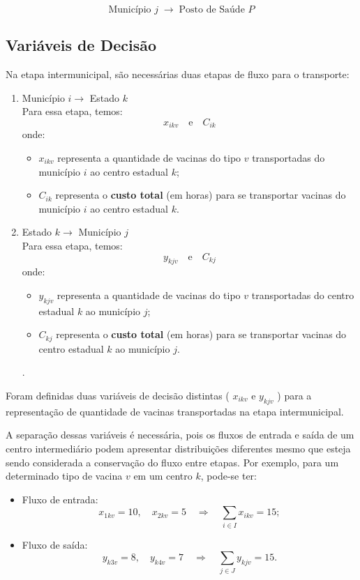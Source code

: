 \[
\text{Município } j \;\longrightarrow\; \text{Posto de Saúde } P
\]

\subsection{Variáveis de Decisão}

Na etapa intermunicipal, são necessárias duas etapas de fluxo para o transporte:

\begin{enumerate}
    \item Município $i \longrightarrow$ Estado $k$ \\
    Para essa etapa, temos:
    \[ x_{ikv} \quad \text{e} \quad C_{ik}\]
    onde:
    \begin{itemize}
    \item $x_{ikv}$ representa a quantidade de vacinas do tipo $v$ transportadas do município $i$ ao centro estadual $k$;
    \item $C_{ik}$ representa o \textbf{custo total} (em horas) para se transportar vacinas do município $i$ ao centro estadual $k$.
    \end{itemize}
    
    \item Estado $k \longrightarrow$ Município $j$ \\
    Para essa etapa, temos:
    \[y_{kjv} \quad \text{e} \quad C_{kj}\]
    onde:
     \begin{itemize}
    \item $y_{kjv}$ representa a quantidade de vacinas do tipo $v$ transportadas do centro estadual $k$ ao município $j$;
    \item $C_{kj}$ representa o \textbf{custo total} (em horas) para se transportar vacinas do centro estadual $k$ ao município $j$.
    \end{itemize}.
\end{enumerate}

Foram definidas duas variáveis de decisão distintas ( $x_{ikv}$ e $y_{kjv}$ ) para a representação de quantidade de vacinas transportadas na etapa intermunicipal.

A separação dessas variáveis é necessária, pois os fluxos de entrada e saída de um centro intermediário podem apresentar distribuições diferentes mesmo que esteja sendo considerada a conservação do fluxo entre etapas. Por exemplo, para um determinado tipo de vacina $v$ em um centro $k$, pode-se ter:

\begin{itemize}
\item Fluxo de entrada:
\[
x_{1kv} = 10, \quad x_{2kv} = 5 \quad \Rightarrow \quad \sum_{i \in I} x_{ikv} = 15;
\]

\item Fluxo de saída:
\[
y_{k3v} = 8, \quad y_{k4v} = 7 \quad \Rightarrow \quad \sum_{j \in J} y_{kjv} = 15.
\]
\end{itemize}

